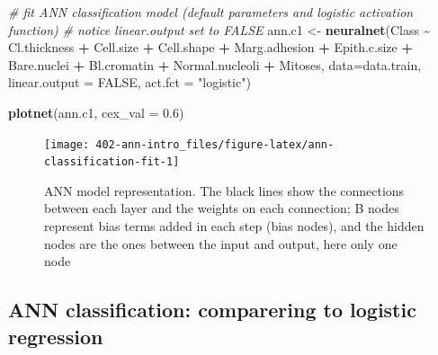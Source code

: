 \documentclass[
]{book}
\newenvironment{Shaded}{\begin{snugshade}}{\end{snugshade}}
\newcommand{\CommentTok}[1]{\textcolor[rgb]{0.56,0.35,0.01}{\textit{#1}}}
\newcommand{\DataTypeTok}[1]{\textcolor[rgb]{0.13,0.29,0.53}{#1}}
\newcommand{\FloatTok}[1]{\textcolor[rgb]{0.00,0.00,0.81}{#1}}
\newcommand{\KeywordTok}[1]{\textcolor[rgb]{0.13,0.29,0.53}{\textbf{#1}}}
\newcommand{\NormalTok}[1]{#1}
\newcommand{\OperatorTok}[1]{\textcolor[rgb]{0.81,0.36,0.00}{\textbf{#1}}}
\newcommand{\OtherTok}[1]{\textcolor[rgb]{0.56,0.35,0.01}{#1}}
\newcommand{\StringTok}[1]{\textcolor[rgb]{0.31,0.60,0.02}{#1}}
\theoremstyle{definition}
\theoremstyle{definition}
\theoremstyle{definition}
\theoremstyle{remark}
\begin{document}
\begin{Shaded}
\begin{Highlighting}[]
\CommentTok{\# fit ANN classification model (default parameters and logistic activation function)}
\CommentTok{\# notice linear.output set to FALSE}
\NormalTok{ann.c1 \textless{}{-}}\StringTok{ }\KeywordTok{neuralnet}\NormalTok{(Class }\OperatorTok{\textasciitilde{}}\StringTok{ }\NormalTok{Cl.thickness }\OperatorTok{+}\StringTok{ }\NormalTok{Cell.size }\OperatorTok{+}\StringTok{  }\NormalTok{Cell.shape }\OperatorTok{+}\StringTok{ }
\StringTok{                        }\NormalTok{Marg.adhesion }\OperatorTok{+}\StringTok{ }\NormalTok{Epith.c.size }\OperatorTok{+}\StringTok{ }\NormalTok{Bare.nuclei }\OperatorTok{+}\StringTok{ }
\StringTok{                        }\NormalTok{Bl.cromatin }\OperatorTok{+}\StringTok{ }\NormalTok{Normal.nucleoli }\OperatorTok{+}\StringTok{ }\NormalTok{Mitoses, }
                        \DataTypeTok{data=}\NormalTok{data.train, }
                        \DataTypeTok{linear.output =} \OtherTok{FALSE}\NormalTok{, }
                        \DataTypeTok{act.fct =} \StringTok{"logistic"}\NormalTok{)}

\KeywordTok{plotnet}\NormalTok{(ann.c1, }\DataTypeTok{cex\_val =} \FloatTok{0.6}\NormalTok{)}
\end{Highlighting}
\end{Shaded}

\begin{figure}

{\centering \texttt{[image: 402-ann-intro\_files/figure-latex/ann-classification-fit-1]} 

}

\caption{ANN model representation. The black lines show the connections between each layer and the weights on each connection; B nodes represent bias terms added in each step (bias nodes), and the hidden nodes are the ones between the input and output, here only one node}\label{fig:ann-classification-fit}
\end{figure}

\hypertarget{ann-classification-comparering-to-logistic-regression}{%
\subsection{ANN classification: comparering to logistic regression}\label{ann-classification-comparering-to-logistic-regression}}
\end{document}
